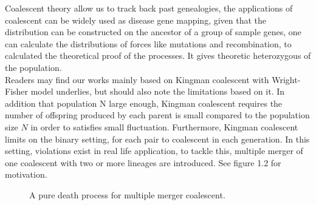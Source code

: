 \documentclass[12pt, a4paper,twoside]{report}
\theoremstyle{definition}
\theoremstyle{myplain}
\theoremstyle{mypro}
\begin{document}
Coalescent theory allow us to track back past genealogies, the applications of coalescent can be widely used as disease gene mapping, given that the distribution can be constructed on the ancestor of a group of sample genes, one can calculate the distributions of forces like mutations and recombination, to calculated the theoretical proof of the processes. It gives theoretic heterozygous of the population.\\

Readers may find our works mainly based on Kingman coalescent with Wright-Fisher model underlies, but should also note the limitations based on it. In addition that population N large enough, Kingman coalescent requires the number of offspring produced by each parent is small compared to the population size $N$ in order to satisfies small fluctuation. Furthermore, Kingman coalescent limits on the binary setting, for each pair to coalescent in each generation. In this setting, violations exist in real life application, to tackle this, multiple merger of one coalescent with two or more lineages are introduced. See figure 1.2 for motivation.\\

\begin{figure}[!h]
\begin{center}
\end{center}
\caption{A pure death process for multiple merger coalescent.}
\end{figure}




\end{document}
